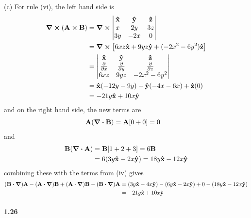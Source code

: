 \documentclass[../main.tex]{subfiles}
\begin{document}
(c) For rule (vi), the left hand side is
\begin{align*}
    \curl(\vb{A} \cp \vb{B}) &= \curl \begin{vmatrix}
        \vu{x} & \vu{y} & \vu{z} \\
        x & 2y & 3z \\
        3y & -2x & 0
    \end{vmatrix} \\
    &= \curl [6xz\vu{x} + 9yz\vu{y} + (-2x^2 - 6y^2)\vu{z}] \\
    &= \begin{vmatrix}
        \vu{x} & \vu{y} & \vu{z} \\
        \pdv{x} & \pdv{y} & \pdv{z} \\
        6xz & 9yz & -2x^2 - 6y^2
    \end{vmatrix} \\
    &= \vu{x} (-12y - 9y) - \vu{y} (-4x - 6x) + \vu{z} (0) \\
    &= -21y\vu{x} + 10x\vu{y}
\end{align*}
and on the right hand side, the new terms are
\begin{align*}
    \vb{A} (\div{\vb{B}}) &= \vb{A} [0 + 0] = 0 
\end{align*}
and
\begin{align*}
    \vb{B} (\div{\vb{A}}) &= \vb{B} [1 + 2 + 3] = 6\vb{B} \\
    &= 6(3y\vu{x} - 2x\vu{y}) = 18y\vu{x} - 12x\vu{y}
\end{align*}
combining these with the terms from (iv) gives
\begin{align*}
    (\vb{B} \vdot \grad) \vb{A} - (\vb{A} \vdot \grad) \vb{B}
    + (\vb{A} \vdot \grad) \vb{B} - (\vb{B} \vdot \grad) \vb{A} &= 
    (3y\vu{x} - 4x\vu{y}) - (6y\vu{x} - 2x\vu{y}) + 0 - (18y\vu{x} - 12x\vu{y}) \\
    &= -21y\vu{x} + 10x\vu{y}
\end{align*}

\paragraph{1.26}
\end{document}
